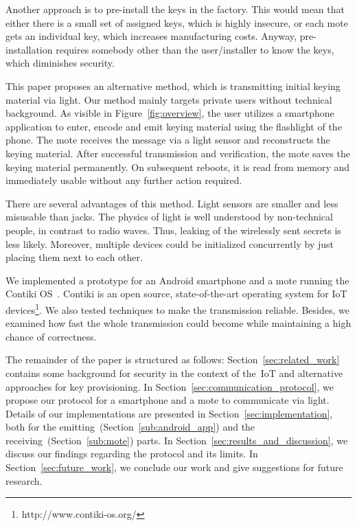 \documentclass{ewsn-proc} %
\begin{document}
Another approach is to pre-install the keys in the factory.
This would mean that either there is a small set of assigned keys, which is highly insecure, or each mote gets an individual key, which increases manufacturing costs.
Anyway, pre-installation requires somebody other than the user/installer to know the keys, which diminishes security.

This paper proposes an alternative method, which is transmitting initial keying material via light.
Our method mainly targets private users without technical background.
As visible in Figure~\ref{fig:overview}, the user utilizes a smartphone application to enter, encode and emit keying material using the flashlight of the phone.
The mote receives the message via a light sensor and reconstructs the keying material.
After successful transmission and verification, the mote saves the keying material permanently.
On subsequent reboots, it is read from memory and immediately usable without any further action required.

There are several advantages of this method.
Light sensors are smaller and less misusable than jacks.
The physics of light is well understood by non-technical people, in contrast to radio waves.
Thus, leaking of the wirelessly sent secrets is less likely.
Moreover, multiple devices could be initialized concurrently by just placing them next to each other.

We implemented a prototype for an Android smartphone and a mote running the Contiki OS~\cite{dunkels04contiki}.
Contiki is an open source, state-of-the-art operating system for IoT devices\footnote{http://www.contiki-os.org/}.
We also tested techniques to make the transmission reliable.
Besides, we examined how fast the whole transmission could become while maintaining a high chance of correctness.

The remainder of the paper is structured as follows:
Section~\ref{sec:related_work} contains some background for security in the context of the~IoT and alternative approaches for key provisioning.
In Section~\ref{sec:communication_protocol}, we propose our protocol for a smartphone and a mote to communicate via light.
Details of our implementations are presented in Section~\ref{sec:implementation}, both for the emitting~(Section~\ref{sub:android_app}) and the receiving~(Section~\ref{sub:mote}) parts.
In Section~\ref{sec:results_and_discussion}, we discuss our findings regarding the protocol and its limits.
In Section~\ref{sec:future_work}, we conclude our work and give suggestions for future research.
\end{document}
